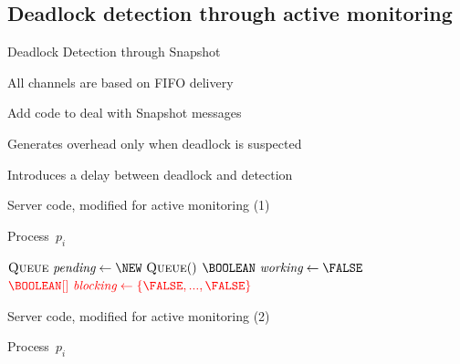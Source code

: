 \subsection{Deadlock detection through active monitoring}

\begin{frame}{Deadlock Detection through Snapshot}

\BI
\item All channels are based on FIFO delivery
\item Add code to deal with Snapshot messages
\EI

\bigskip
{}
\BI
\item Generates overhead only when deadlock is suspected
\item Introduces a delay between deadlock and detection
\EI


\end{frame}

\begin{frame}[shrink]{Server code, modified for active monitoring (1)}


\begin{Procedure}
\caption{Process\ $p_i$}
  $\Queue\ \Pending \gets \NEW\ \Queue()$\;
  $\BOOLEAN\ \Working \gets \FALSE$\;
  $\color{red} \BOOLEAN[]\ \Blocking \gets \{ \FALSE, ..., \FALSE \}$\;
\end{Procedure}

\end{frame}

\begin{frame}[shrink]{Server code, modified for active monitoring (2)}

\begin{Procedure}
\caption{Process\ $p_i$}
\end{Procedure}

\end{frame}

